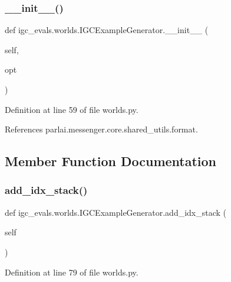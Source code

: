 \subsubsection{\texorpdfstring{\+\_\+\+\_\+init\+\_\+\+\_\+()}{\_\_init\_\_()}}
{\footnotesize\ttfamily def igc\+\_\+evals.\+worlds.\+I\+G\+C\+Example\+Generator.\+\_\+\+\_\+init\+\_\+\+\_\+ (\begin{DoxyParamCaption}\item[{}]{self,  }\item[{}]{opt }\end{DoxyParamCaption})}



Definition at line 59 of file worlds.\+py.



References parlai.\+messenger.\+core.\+shared\+\_\+utils.\+format.



\subsection{Member Function Documentation}
\mbox{\label{classigc__evals_1_1worlds_1_1IGCExampleGenerator_aa0801aa3a53c7fd57a759c2080936174}} 
\subsubsection{\texorpdfstring{add\+\_\+idx\+\_\+stack()}{add\_idx\_stack()}}
{\footnotesize\ttfamily def igc\+\_\+evals.\+worlds.\+I\+G\+C\+Example\+Generator.\+add\+\_\+idx\+\_\+stack (\begin{DoxyParamCaption}\item[{}]{self }\end{DoxyParamCaption})}



Definition at line 79 of file worlds.\+py.



